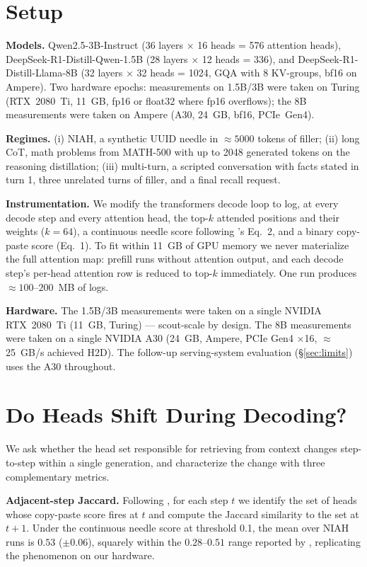 \documentclass[11pt]{article}
\begin{document}
\section{Setup}
\label{sec:setup}

\textbf{Models.} Qwen2.5-3B-Instruct (36 layers $\times$ 16 heads = 576
attention heads), DeepSeek-R1-Distill-Qwen-1.5B (28 layers $\times$ 12
heads = 336), and DeepSeek-R1-Distill-Llama-8B (32 layers $\times$ 32
heads = 1024, GQA with 8 KV-groups, bf16 on Ampere). Two hardware
epochs: measurements on 1.5B/3B were taken on Turing (RTX~2080~Ti, 11~GB, fp16 or float32
where fp16 overflows); the 8B measurements were taken on Ampere
(A30, 24~GB, bf16, PCIe~Gen4).

\textbf{Regimes.} (i) NIAH, a synthetic UUID needle in $\approx 5000$
tokens of filler; (ii) long CoT, math problems from MATH-500 with up to
2048 generated tokens on the reasoning distillation; (iii) multi-turn,
a scripted conversation with facts stated in turn 1, three unrelated
turns of filler, and a final recall request.

\textbf{Instrumentation.} We modify the transformers decode loop to log,
at every decode step and every attention head, the top-$k$ attended
positions and their weights ($k = 64$), a continuous needle score
following \cite{retrievalheadsdynamic}'s Eq.~2, and a binary copy-paste
score (Eq.~1). To fit within 11~GB of GPU memory we never materialize
the full attention map: prefill runs without attention output, and each
decode step's per-head attention row is reduced to top-$k$ immediately.
One run produces $\approx 100$--$200$~MB of logs.

\textbf{Hardware.} The 1.5B/3B measurements were taken on a single
NVIDIA RTX~2080~Ti (11~GB, Turing) --- scout-scale by design. The
8B measurements were taken on a single NVIDIA A30 (24~GB, Ampere,
PCIe Gen4 $\times$16, $\approx$25~GB/s achieved H2D). The follow-up
serving-system evaluation (\S\ref{sec:limits}) uses the A30 throughout.

\section{Do Heads Shift During Decoding?}
\label{sec:churn}

We ask whether the head set responsible for retrieving from context
changes step-to-step within a single generation, and characterize the
change with three complementary metrics.

\textbf{Adjacent-step Jaccard.} Following \cite{retrievalheadsdynamic},
for each step $t$ we identify the set of heads whose copy-paste score
fires at $t$ and compute the Jaccard similarity to the set at $t{+}1$.
Under the continuous needle score at threshold 0.1, the mean over NIAH
runs is $0.53$ ($\pm 0.06$), squarely within the $0.28$--$0.51$ range
reported by \cite{retrievalheadsdynamic}, replicating the phenomenon on
our hardware.
\end{document}
